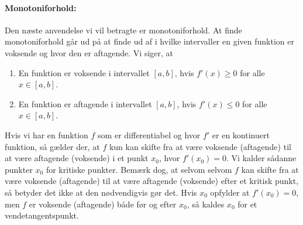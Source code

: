 \paragraph*{Monotoniforhold:}
Den næste anvendelse vi vil betragte er monotoniforhold. At finde monotoniforhold går ud på at finde ud af i hvilke intervaller en given funktion er voksende og hvor den er aftagende. Vi siger, at
\begin{enumerate}
\item En funktion er voksende i intervallet $[a,b]$, hvis $f'(x) \geq 0$ for alle $x \in [a,b]$.
\item En funktion er aftagende i intervallet $[a,b]$, hvis $f'(x) \leq 0$ for alle $x \in [a,b]$.
\end{enumerate}
Hvis vi har en funktion $f$ som er differentiabel og hvor $f'$ er en kontinuert funktion, så gælder der, at $f$ kun kan skifte fra at være voksende (aftagende) til at være aftagende (voksende) i et punkt $x_0$, hvor $f'(x_0)=0$. Vi kalder sådanne punkter $x_0$ for kritiske punkter. Bemærk dog, at selvom selvom $f$ kan skifte fra at være voksende (aftagende) til at være aftagende (voksende) efter et kritisk punkt, så betyder det ikke at den nødvendigvis gør det. Hvis $x_0$ opfylder at $f'(x_0)=0$, men $f$ er voksende (aftagende) både før og efter $x_0$, så kaldes $x_0$ for et vendetangentspunkt.

